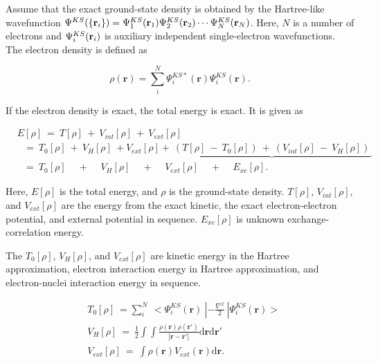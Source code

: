 \documentclass[a4paper, 12pt, titlepage,oneside,drop]{kthesis}
\begin{document}
Assume that the exact ground-state density is obtained by the Hartree-like wavefunction $\wfks = \bwf<1><1> \bwf<2><2> \cdots \bwf<N><N>$. Here, $N$ is a number of electrons and $\bwf<i><i>$ is auxiliary independent
single-electron wavefunctions. The electron density is defined as

\begin{equation}\label{ks1}
 \rho(\textbf{r}) = \sum\limits_i^{N} {\Psi^{{KS}*}_{i}(\textbf{r})} {\Psi^{{KS}}_{i}(\textbf{r})}.
\end{equation}

If the electron density is exact, the total energy is exact. It is given as

\begin{equation}\label{kse}
\begin{split}
&E[\rho] \ =\ T[\rho] \ + \ V_{int}[\rho] \ + \ V_{ext}[\rho]  \\
&\ \ \   = \ T_{0}[\rho] \ + \ V_{H}[\rho] \ + V_{ext}[\rho]+\underbrace{\ (T[\rho] \ - \ T_{0}[\rho]) \ + \  (V_{int}[\rho] \ - \ V_{H}[\rho])\ }       \\
&\ \ \   = \ T_{0}[\rho] \quad \,  + \quad \,  V_{H}[\rho] \quad \, + \quad \, V_{ext}[\rho] \quad \, + \quad \, E_{xc}[\rho].
\end{split}
\end{equation}

Here, $E[\rho]$  is the total energy, and $\rho$ is the ground-state density. $T[\rho]$, $V_{int}[\rho]$, and $V_{ext}[\rho]$ are the energy from the exact kinetic, 
the exact electron-electron potential, and external potential in sequence. $E_{xc}[\rho]$ is unknown exchange-correlation energy.

The $T_{0}[\rho]$, $V_{H}[\rho]$, and $V_{ext}[\rho]$ are kinetic energy in the Hartree approximation, electron interaction energy in Hartree approximation, and electron-nuclei interaction energy in sequence.

\begin{equation}\begin{split}\label{kankan}
& T_{0}[\rho]\ = \sum\limits_i^{N} \ < \Psi_{i}^{{KS}}(\textbf{r}) \ | -\frac{\nabla^{2}}{2} \ | \Psi_{i}^{{KS}}(\textbf{r}) > \\
& V_{H}[\rho] \ = \ \frac{1}{2} \int \int  \frac{\rho({\textbf{r}})\rho(\textbf{r}')}{|{\textbf{r}}-{\textbf{r}}'|} \mathrm{d} {\textbf{r}} \mathrm{d}{\textbf{r}'}\\
& V_{ext}[\rho]\ = \ \int  \rho(\textbf{r}) V_{ext}(\textbf{r})\mathrm{d}{\textbf{r}}. 
\end{split}
\end{equation}
\end{document}
